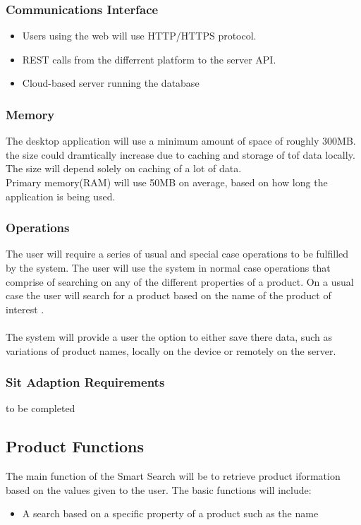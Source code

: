 \documentclass[a4paper,10pt]{article}
\begin{document}
	    \subsubsection{Communications Interface}
	 \begin{itemize}
	    \item Users using the web will use HTTP/HTTPS protocol.
	    \item REST calls from the differrent platform to the server API.
	    \item Cloud-based server running the database
	    \end{itemize}
            \subsubsection{Memory}
	    {The desktop application will use a minimum amount of space of roughly 300MB.  the size could dramtically increase due to caching and storage of tof data locally. The size will depend solely on caching of a lot of data. \\
Primary memory(RAM) will use 50MB on average, based on how long the application is being used.}
            \subsubsection{Operations}

            	{The user will require a series of usual and special case operations to be fulfilled by the system. The user will use the system in normal case operations that comprise of searching on any of the different properties of a product. On a usual case the user will search for a product based on the name of the product of interest .\\\\
            	The system will provide a user the option to either save there data, such as variations of product names, locally on the device or remotely on the server.}
           \subsubsection{Sit Adaption Requirements}
        to be completed
		\subsection{Product Functions} {The main function of the Smart Search will be to retrieve product iformation based on the values given to the user. The basic functions will include:  }
	\begin{itemize}
  		\item A search based on a specific property of a product such as the name
	\end{itemize}
\end{document}
